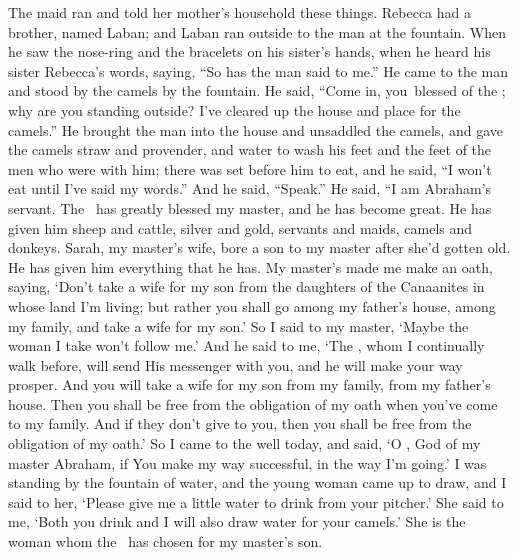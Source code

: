 \begin{inparaenum}
   The maid ran and told her mother's household these things.%
   Rebecca had a brother, named Laban; and Laban ran outside to the man at the fountain.%
   When he saw the nose-ring and the bracelets on his sister's hands, when he heard his sister Rebecca's words, saying, ``So has the man said to me.'' He came to the man and stood by the camels by the fountain.%
   He said, ``Come in, you\understood\ blessed of the \lord; why are you standing outside? I've cleared up the house and place for the camels.''%
   He brought the man into the house and unsaddled the camels, and gave the camels straw and provender, and water to wash his feet and the feet of the men who were with him;%
   there was set before him to eat, and he said, ``I won't eat until I've said my words.'' And he said, ``Speak.''%
   He said, ``I am Abraham's servant.%
   The \lord\ has greatly blessed my master, and he has become great. He has given him sheep and cattle, silver and gold, servants and maids, camels and donkeys.%
   Sarah, my master's wife, bore a son to my master after she'd gotten old. He has given him everything that he has.%
   My master's made me make an oath, saying, `Don't take a wife for my son from the daughters of the Canaanites in whose land I'm living;%
   but rather you shall go among my father's house, among my family, and take a wife for my son.'%
   So I said to my master, `Maybe the woman I take won't follow me.'%
   And he said to me, `The \lord, whom I continually walk before, will send His messenger with you, and he will make your way prosper. And you will take a wife for my son from my family, from my father's house.%
   Then you shall be free from the obligation of my oath when you've come to my family. And if they don't give to you, then you shall be free from the obligation of my oath.'%
   So I came to the well today, and said, `O \lord, God of my master Abraham, if You make my way successful, in the way I'm going.'%
   I was standing by the fountain of water, and the young woman came up to draw, and I said to her, `Please give me a little water to drink from your pitcher.'%
   She said to me, `Both you drink and I will also draw water for your camels.' She is the woman whom the \lord\ has chosen for my master's son.%

\end{inparaenum}
